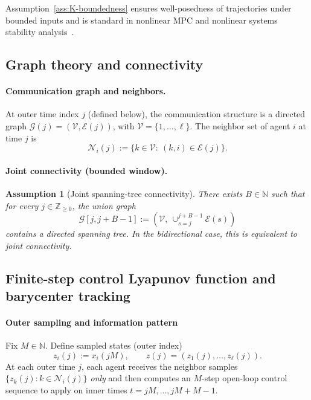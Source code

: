 \documentclass[12pt,draftcls,onecolumn]{IEEEtran}
\newtheorem{assumption}{Assumption}
\def\field#1{\mathbb #1}%
\def\N{\field{N}}%
\def\Z{\field{Z}}%
\newcommand{\Zp}{\Z_{\geq 0}}
\def\Ni{\mathcal{N}_i}
\begin{document}
Assumption~\ref{ass:K-boundedness} ensures well-posedness of trajectories under bounded inputs and is standard in nonlinear MPC and nonlinear systems stability analysis~\cite{Grune.2014,Geiselhart.2014c}.

\subsection{Graph theory and connectivity}
\label{subsec:graph_stability}

\paragraph{Communication graph and neighbors.}
At outer time index $j$ (defined below), the communication structure is a directed graph
$\mathcal{G}(j)=(\mathcal{V},\mathcal{E}(j))$, with $\mathcal{V}=\{1,\dots,\ell\}$.
The neighbor set of agent $i$ at time $j$ is
\[
\Ni(j):=\{k\in\mathcal{V}:\ (k,i)\in\mathcal{E}(j)\}.
\]

\paragraph{Joint connectivity (bounded window).}
\begin{assumption}[Joint spanning-tree connectivity]\label{ass:joint_tree}
There exists $B\in\mathbb{N}$ such that for every $j \in \Zp$, the union graph
\[
\mathcal{G}[j,j+B-1] := (\mathcal{V},\ \cup_{s=j}^{j+B-1}\mathcal{E}(s))
\]
contains a directed spanning tree. In the bidirectional case, this is equivalent to joint connectivity.
\end{assumption}


\subsection{Finite-step control Lyapunov function and barycenter tracking}
\paragraph{Outer sampling and information pattern}
Fix $M\in\N$. 
Define sampled states (outer index)
\begin{equation}
z_i(j):=x_i(jM),\qquad z(j)=(z_1(j),\dots,z_\ell(j)).
\end{equation}
At each outer time $j$, each agent receives the neighbor samples $\{z_k(j):k\in\mathcal{N}_i(j)\}$ \emph{only} and then
computes an $M$-step open-loop control sequence to apply on inner times $t=jM,\dots,jM+M-1$.
\end{document}
